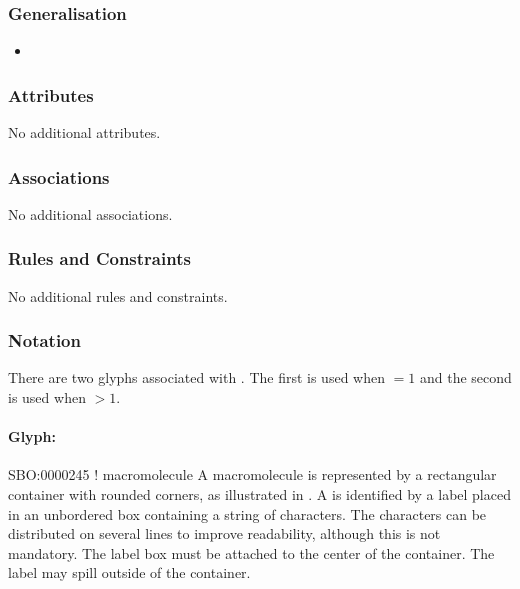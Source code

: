 \subsubsection{Generalisation}

\begin{itemize}
\item {}
\end{itemize}

\subsubsection{Attributes}

No additional attributes.

\subsubsection{Associations}

No additional associations.

\subsubsection{Rules and Constraints}

No additional rules and constraints.

\subsubsection{Notation}

There are two glyphs associated with . The
first  is used when  $= 1$
and the second  is used when
 $> 1$.

\paragraph{Glyph: }

\begin{glyphDescription}
\glyphSboTerm SBO:0000245 ! macromolecule
\glyphContainer A macromolecule is represented by a rectangular container with rounded
corners, as illustrated in .
\glyphLabel A  is identified by a label placed in an unbordered box containing a string of characters.  The characters can be distributed on several lines to improve readability, although this is not mandatory.  The label box must be attached to the center of the container.  The label may spill outside of the container.
\end{glyphDescription}

